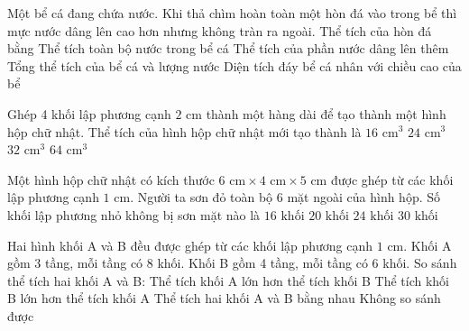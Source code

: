 \begin{ex} %
Một bể cá đang chứa nước. Khi thả chìm hoàn toàn một hòn đá vào trong bể thì mực nước dâng lên cao hơn nhưng không tràn ra ngoài. Thể tích của hòn đá bằng
\choice
{Thể tích toàn bộ nước trong bể cá}
{\True Thể tích của phần nước dâng lên thêm}
{Tổng thể tích của bể cá và lượng nước}
{Diện tích đáy bể cá nhân với chiều cao của bể}
\end{ex}

\begin{ex} %
Ghép 4 khối lập phương cạnh $2\text{ cm}$ thành một hàng dài để tạo thành một hình hộp chữ nhật. Thể tích của hình hộp chữ nhật mới tạo thành là
\choice
{$16\text{ cm}^3$}
{$24\text{ cm}^3$}
{\True $32\text{ cm}^3$}
{$64\text{ cm}^3$}
\end{ex}

\begin{ex} %
Một hình hộp chữ nhật có kích thước $6\text{ cm} \times 4\text{ cm} \times 5\text{ cm}$ được ghép từ các khối lập phương cạnh $1\text{ cm}$. Người ta sơn đỏ toàn bộ 6 mặt ngoài của hình hộp. Số khối lập phương nhỏ không bị sơn mặt nào là
\choice
{$16\text{ khối}$}
{$20\text{ khối}$}
{\True $24\text{ khối}$}
{$30\text{ khối}$}
\end{ex}

\begin{ex} %
Hai hình khối A và B đều được ghép từ các khối lập phương cạnh $1\text{ cm}$. Khối A gồm 3 tầng, mỗi tầng có 8 khối. Khối B gồm 4 tầng, mỗi tầng có 6 khối. So sánh thể tích hai khối A và B:
\choice
{Thể tích khối A lớn hơn thể tích khối B}
{Thể tích khối B lớn hơn thể tích khối A}
{\True Thể tích hai khối A và B bằng nhau}
{Không so sánh được}
\end{ex}

